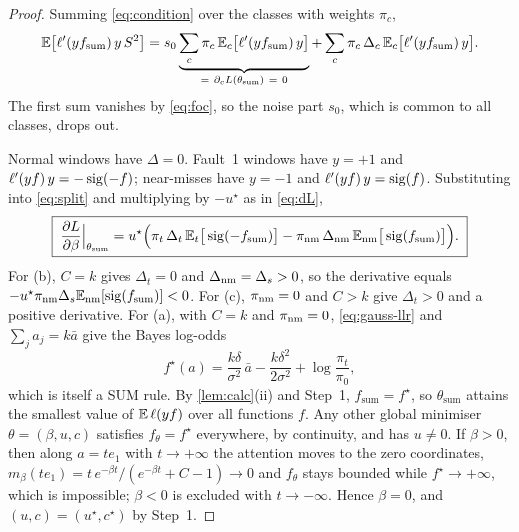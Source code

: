 \begin{proof}
 Summing \cref{eq:condition} over the classes with weights $\pi_c$,
\begin{equation}\label{eq:split}
  \E\big[\ell'(yf_{\mathrm{sum}})\,y\,S^2\big]
  =s_0\underbrace{\sum_c\pi_c\,\E_c\big[\ell'(yf_{\mathrm{sum}})\,y\big]}_{=\ \partial_cL(\theta_{\mathrm{sum}})\ =\ 0}
  +\sum_c\pi_c\,\Delta_c\,\E_c\big[\ell'(yf_{\mathrm{sum}})\,y\big].
\end{equation}
The first sum vanishes by \cref{eq:foc}, so the noise part $s_0$, which is common to all classes, drops out.

 Normal windows have $\Delta=0$. Fault~1 windows have $y=+1$ and $\ell'(yf)\,y=-\operatorname{sig}(-f)$; near-misses have $y=-1$ and $\ell'(yf)\,y=\operatorname{sig}(f)$. Substituting into \cref{eq:split} and multiplying by $-u^\star$ as in \cref{eq:dL},
\begin{equation}\label{eq:classes}
  \boxed{\;\frac{\partial L}{\partial\beta}\Big|_{\theta_{\mathrm{sum}}}
  =u^\star\Big(\pi_t\,\Delta_t\,\mathbb{E}_t\big[\operatorname{sig}(-f_{\mathrm{sum}})\big]-\pi_{\mathrm{nm}}\,\Delta_{\mathrm{nm}}\,\mathbb{E}_{\mathrm{nm}}\big[\operatorname{sig}(f_{\mathrm{sum}})\big]\Big).\;}
\end{equation}
For (b), $C=k$ gives $\Delta_t=0$ and $\Delta_{\mathrm{nm}}=\Delta_s>0$, so the derivative equals $-u^\star\pi_{\mathrm{nm}}\Delta_s\mathbb{E}_{\mathrm{nm}}[\operatorname{sig}(f_{\mathrm{sum}})]<0$. For (c), $\pi_{\mathrm{nm}}=0$ and $C>k$ give $\Delta_t>0$ and a positive derivative. For (a), with $C=k$ and $\pi_{\mathrm{nm}}=0$, \cref{eq:gauss-llr} and $\sum_ja_j=k\bar a$ give the Bayes log-odds
\begin{equation}\label{eq:bayes}
  f^\star(a)=\frac{k\delta}{\sigma^2}\,\bar a-\frac{k\delta^2}{2\sigma^2}+\log\frac{\pi_t}{\pi_0},
\end{equation}
which is itself a SUM rule. By \cref{lem:calc}(ii) and Step~1, $f_{\mathrm{sum}}=f^\star$, so $\theta_{\mathrm{sum}}$ attains the smallest value of $\mathbb{E}\,\ell(yf)$ over all functions $f$. Any other global minimiser $\theta=(\beta,u,c)$ satisfies $f_\theta=f^\star$ everywhere, by continuity, and has $u\neq0$. If $\beta>0$, then along $a=te_1$ with $t\to+\infty$ the attention moves to the zero coordinates, $m_\beta(te_1)=t\,e^{-\beta t}/(e^{-\beta t}+C-1)\to0$ and $f_\theta$ stays bounded while $f^\star\to+\infty$, which is impossible; $\beta<0$ is excluded with $t\to-\infty$. Hence $\beta=0$, and $(u,c)=(u^\star,c^\star)$ by Step~1.


\end{proof}
